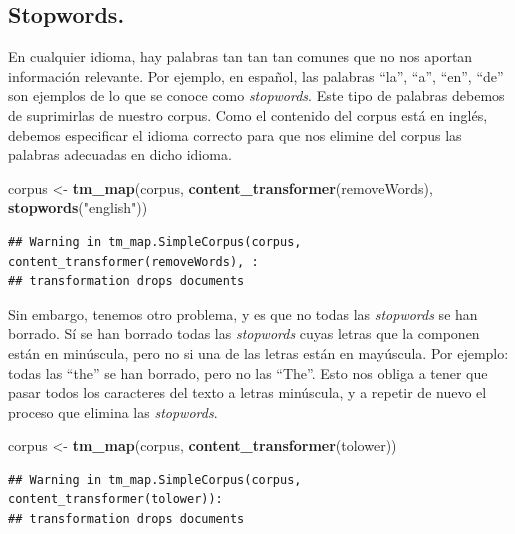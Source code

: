 \documentclass[spanish,]{article}
\newenvironment{Shaded}{\begin{snugshade}}{\end{snugshade}}
\newcommand{\KeywordTok}[1]{\textcolor[rgb]{0.13,0.29,0.53}{\textbf{#1}}}
\newcommand{\StringTok}[1]{\textcolor[rgb]{0.31,0.60,0.02}{#1}}
\newcommand{\NormalTok}[1]{#1}
\begin{document}
\subsection{Stopwords.}\label{stopwords.}

En cualquier idioma, hay palabras tan tan tan comunes que no nos aportan
información relevante. Por ejemplo, en español, las palabras ``la'',
``a'', ``en'', ``de'' son ejemplos de lo que se conoce como
\textit{stopwords}. Este tipo de palabras debemos de suprimirlas de
nuestro corpus. Como el contenido del corpus está en inglés, debemos
especificar el idioma correcto para que nos elimine del corpus las
palabras adecuadas en dicho idioma.

\begin{Shaded}
\begin{Highlighting}[]
\NormalTok{corpus <-}\StringTok{ }\KeywordTok{tm_map}\NormalTok{(corpus, }\KeywordTok{content_transformer}\NormalTok{(removeWords), }
          \KeywordTok{stopwords}\NormalTok{(}\StringTok{"english"}\NormalTok{))}
\end{Highlighting}
\end{Shaded}

\begin{verbatim}
## Warning in tm_map.SimpleCorpus(corpus, content_transformer(removeWords), :
## transformation drops documents
\end{verbatim}

Sin embargo, tenemos otro problema, y es que no todas las
\textit{stopwords} se han borrado. Sí se han borrado todas las
\textit{stopwords} cuyas letras que la componen están en minúscula, pero
no si una de las letras están en mayúscula. Por ejemplo: todas las
``the'' se han borrado, pero no las ``The''. Esto nos obliga a tener que
pasar todos los caracteres del texto a letras minúscula, y a repetir de
nuevo el proceso que elimina las \textit{stopwords}.

\begin{Shaded}
\begin{Highlighting}[]
\NormalTok{corpus <-}\StringTok{ }\KeywordTok{tm_map}\NormalTok{(corpus, }\KeywordTok{content_transformer}\NormalTok{(tolower))}
\end{Highlighting}
\end{Shaded}

\begin{verbatim}
## Warning in tm_map.SimpleCorpus(corpus, content_transformer(tolower)):
## transformation drops documents
\end{verbatim}
\end{document}
